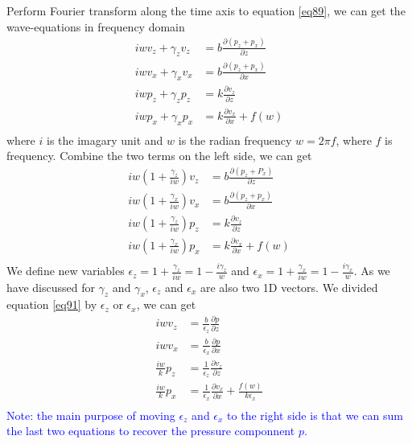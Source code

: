 \documentclass[revised,endfloat]{geophysics}
\begin{document}
Perform Fourier transform along the time axis to equation \ref{eq89}, we can get the wave-equations in frequency domain
\begin{equation}
\begin{split}
iw v_z + \gamma_z v_z &= b \frac{\partial (p_z+p_x)}{\partial z}  \\
iw v_x + \gamma_x v_x &= b \frac{\partial (p_z+p_x)}{\partial x}  \\
iw p_z + \gamma_z p_z &= k  \frac{\partial v_z}{\partial z}       \\
iw p_x + \gamma_x p_x &= k  \frac{\partial v_x}{\partial x} + f(w)\\
\end{split}
\label{eq90}
\end{equation}
where $i$ is the imagary unit and $w$ is the radian frequency $w = 2 \pi f$, where $f$ is frequency. Combine the two terms on the left side, we can get
\begin{equation}
\begin{split}
iw (1 + \frac{\gamma_z}{iw}) v_z &= b \frac{\partial (p_z+P_x)}{\partial z}  \\
iw (1 + \frac{\gamma_x}{iw}) v_x &= b \frac{\partial (p_z+p_x)}{\partial x}  \\
iw (1 + \frac{\gamma_z}{iw}) p_z &= k  \frac{\partial v_z}{\partial z}       \\
iw (1 + \frac{\gamma_x}{iw}) p_x &= k  \frac{\partial v_x}{\partial x} + f(w)\\
\end{split} 
\label{eq91} 
\end{equation}
We define new variables $\epsilon_z = 1+ \frac{\gamma_z}{iw} = 1 - \frac{i \gamma_z}{w}$ and $\epsilon_x = 1+ \frac{\gamma_x}{iw} = 1 - \frac{i \gamma_x}{w}$. As we have discussed for $\gamma_z$ and $\gamma_x$, $\epsilon_z$ and $\epsilon_x$ are also two 1D vectors.
We divided equation \ref{eq91} by $\epsilon_z$ or $\epsilon_x$, we can get
\begin{equation}
\begin{split}
iw v_z &= \frac{b}{\epsilon_z} \frac{\partial p}{\partial z}  \\
iw v_x &= \frac{b}{\epsilon_x} \frac{\partial p}{\partial x}  \\
\frac{iw}{k} p_z &= \frac{1}{\epsilon_z} \frac{\partial v_z}{\partial z}       \\
\frac{iw}{k} p_x &= \frac{1}{\epsilon_x} \frac{\partial v_x}{\partial x} + \frac{f(w)}{k \epsilon_x}\\
\end{split} 
\label{eq92}
\end{equation}
\textcolor{blue}{Note: the main purpose of moving $\epsilon_z$ and $\epsilon_x$ to the right side is that we can sum the last two equations to recover the pressure componnent $p$.}
\end{document}
